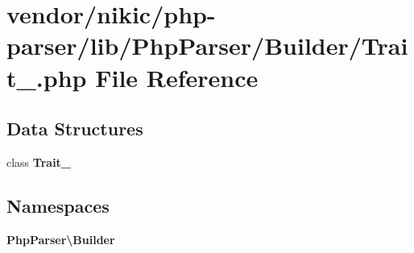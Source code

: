 \section{vendor/nikic/php-\/parser/lib/\+Php\+Parser/\+Builder/\+Trait\+\_\+.php File Reference}
\label{_builder_2_trait___8php}
\subsection*{Data Structures}
\begin{DoxyCompactItemize}
\item 
class {\bf Trait\+\_\+}
\end{DoxyCompactItemize}
\subsection*{Namespaces}
\begin{DoxyCompactItemize}
\item 
 {\bf Php\+Parser\textbackslash{}\+Builder}
\end{DoxyCompactItemize}
